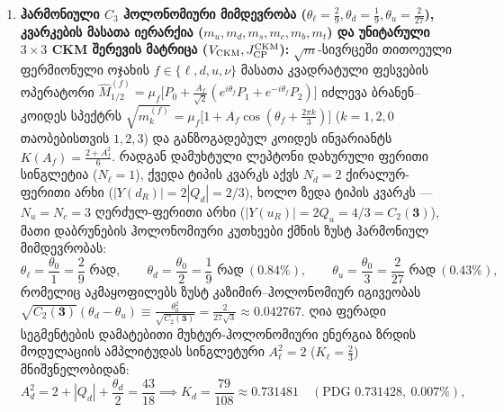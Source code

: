 \documentclass[11pt,a4paper]{article}
\begin{document}
\begin{enumerate}[label=\arabic*.]
\[
\begin{aligned}
   \Delta m_{np}^{\rm RefG} &= \Delta m_{np}^{\rm QCD} + \Delta m_{np}^{\rm QED} = +2.3731 - 1.0797 = +1.29333\text{ მეV} \\
   &> m_e = 0.51100\text{ მეV} \implies Q_\beta = +782.33\text{ კეV} > 0,
\end{aligned}
\]
და იცავს ატომურ წყალბადს შებრუნებული ბეტა-ჩაჭერისგან ($m_d - m_u = 2.51\text{ მეV} > (m_d - m_u)_{\rm crit} = 1.68\text{ მეV}$). ამასთან, ნებისმიერ სტატიკურ იზოტროპულ კოფრეიმზე $(p_T, p_L)$ და კოსმოლოგიური რელაქსაციისას $p(A) = A^{-3/5}$ უგანზომილებო ფარდობები $m_n/m_p$, $\Delta m_{np}/m_e$, $\mu_n/\mu_p$ და პროტონ–ელექტრონის მასათა ფარდობა $\mu_{pe} = m_p/m_e = 1836.152673$ იგივურად ინვარიანტულია ($\Delta\mu_{pe}/\mu_{pe} \equiv 0$, კვაზარების შთანთქმის სპექტრების ზღვართან $|\Delta\mu_{pe}/\mu_{pe}| < 10^{-7}$ სრულ თანხვედრაში და BBN-ის $Q_{np}$ ინვარიანტობის ჩაკეტვით).
\item \textbf{ჰარმონიული $C_3$ ჰოლონომიური მიმდევრობა ($\theta_\ell = \frac{2}{9}, \theta_d = \frac{1}{9}, \theta_u = \frac{2}{27}$), კვარკების მასათა იერარქია ($m_u, m_d, m_s, m_c, m_b, m_t$) და უნიტარული $3\times 3$ CKM შერევის მატრიცა ($V_{\rm CKM}, J_{\rm CP}^{\rm CKM}$):} $\sqrt{m}$-სივრცეში თითოეული ფერმიონული ოჯახის $f \in \{\ell, d, u, \nu\}$ მასათა კვადრატული ფესვების ოპერატორი $\widehat{M}_{1/2}^{(f)} = \mu_f\bigl[P_0 + \frac{A_f}{\sqrt{2}}(e^{i\theta_f}P_1 + e^{-i\theta_f}P_2)\bigr]$ იძლევა ბრანენ–კოიდეს სპექტრს $\sqrt{m_k^{(f)}} = \mu_f\bigl[1 + A_f\cos(\theta_f + \frac{2\pi k}{3})\bigr]$ ($k=1,2,0$ თაობებისთვის $1,2,3$) და განზოგადებულ კოიდეს ინვარიანტს $K(A_f) = \frac{2 + A_f^2}{6}$. რადგან დამუხტული ლეპტონი დახურული ფერითი სინგლეტია ($N_\ell = 1$), ქვედა ტიპის კვარკს აქვს $N_d = 2$ ქირალურ-ფერითი არხი ($|Y(d_R)| = 2|Q_d| = 2/3$), ხოლო ზედა ტიპის კვარკს — $N_u = N_c = 3$ ღერძულ-ფერითი არხი ($|Y(u_R)| = 2Q_u = 4/3 = C_2(\mathbf{3})$), მათი დაბრუნების ჰოლონომიური კუთხეები ქმნის ზუსტ ჰარმონიულ მიმდევრობას:
\[
   \theta_\ell = \frac{\theta_0}{1} = \frac{2}{9}\text{ რად}, \qquad \theta_d = \frac{\theta_0}{2} = \frac{1}{9}\text{ რად}\ (0.84\%), \qquad \theta_u = \frac{\theta_0}{3} = \frac{2}{27}\text{ რად}\ (0.43\%),
\]
რომელიც აკმაყოფილებს ზუსტ კაზიმირ–ჰოლონომიურ იგივეობას $\sqrt{C_2(\mathbf{3})}(\theta_d - \theta_u) \equiv \frac{\theta_0^2}{\sqrt{C_2(\mathbf{3})}} = \frac{2}{27\sqrt{3}} \approx 0.042767$. ღია ფერადი სეგმენტების დამატებითი მუხტურ-ჰოლონომიური ენერგია ზრდის მოდულაციის ამპლიტუდას სინგლეტური $A_\ell^2 = 2$ ($K_\ell = \frac{2}{3}$) მნიშვნელობიდან:
\[
   A_d^2 = 2 + |Q_d| + \frac{\theta_d}{2} = \frac{43}{18} \implies K_d = \frac{79}{108} \approx 0.731481 \quad (\text{PDG } 0.731428,\ 0.007\%),
\]
\end{enumerate}
\end{document}
